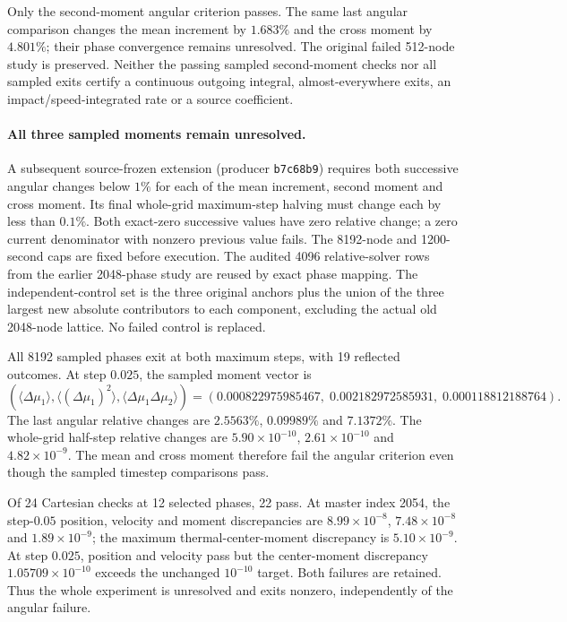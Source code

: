 \documentclass[11pt,letterpaper]{article}
\begin{document}
Only the second-moment angular criterion passes. The same last angular
comparison changes the mean increment by $1.683\%$ and the cross moment by
$4.801\%$; their phase convergence remains unresolved. The original failed
512-node study is preserved. Neither the passing sampled second-moment
checks nor all sampled exits certify a continuous outgoing integral,
almost-everywhere exits, an impact/speed-integrated rate or a source
coefficient.

\paragraph{All three sampled moments remain unresolved.}
A subsequent source-frozen extension (producer \texttt{b7c68b9}) requires
both successive angular changes below $1\%$ for each of the mean increment,
second moment and cross moment. Its final whole-grid maximum-step halving
must change each by less than $0.1\%$. Both exact-zero successive values
have zero relative change; a zero current denominator with nonzero previous
value fails. The 8192-node and 1200-second caps are fixed before execution.
The audited 4096 relative-solver rows from the earlier 2048-phase study are
reused by exact phase mapping. The independent-control set is the three
original anchors plus the union of the three largest new absolute
contributors to each component, excluding the actual old 2048-node lattice.
No failed control is replaced.

All 8192 sampled phases exit at both maximum steps, with 19 reflected
outcomes. At step $0.025$, the sampled moment vector is
\[
 (\langle\Delta\mu_1\rangle,
   \langle(\Delta\mu_1)^2\rangle,
   \langle\Delta\mu_1\Delta\mu_2\rangle)
 = (0.000822975985467,\;0.002182972585931,\;0.000118812188764).
\]
The last angular relative changes are $2.5563\%$, $0.09989\%$ and
$7.1372\%$. The whole-grid half-step relative changes are
$5.90\times10^{-10}$, $2.61\times10^{-10}$ and $4.82\times10^{-9}$.
The mean and cross moment therefore fail the angular criterion even though
the sampled timestep comparisons pass.

Of 24 Cartesian checks at 12 selected phases, 22 pass. At master index
2054, the step-$0.05$ position, velocity and moment discrepancies are
$8.99\times10^{-8}$, $7.48\times10^{-8}$ and $1.89\times10^{-9}$;
the maximum thermal-center-moment discrepancy is $5.10\times10^{-9}$.
At step $0.025$, position and velocity pass but the center-moment discrepancy
$1.05709\times10^{-10}$ exceeds the unchanged $10^{-10}$ target. Both
failures are retained. Thus the whole experiment is unresolved and exits
nonzero, independently of the angular failure.
\end{document}
